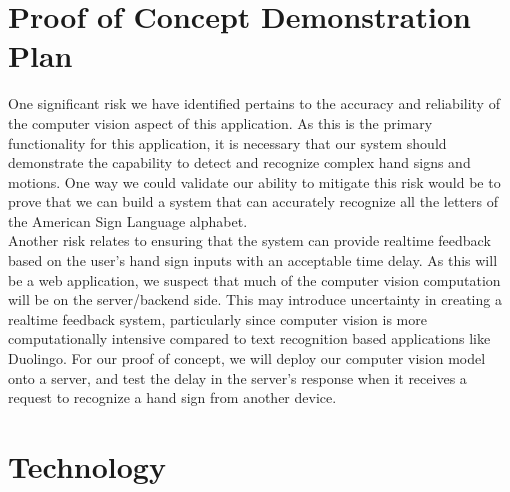 \documentclass{article}
\begin{document}
\section{Proof of Concept Demonstration Plan}

One significant risk we have identified pertains to the accuracy and reliability of the computer vision aspect of this application. As this is the
primary functionality for this application, it is necessary that our system should demonstrate the capability to detect and recognize complex
hand signs and motions. One way we could validate our ability to mitigate this risk would be to prove that we can build a 
system that can accurately recognize all the letters of the American Sign Language alphabet.
\\

Another risk relates to ensuring that the system can provide realtime feedback based on the user's hand sign inputs with
an acceptable time delay. As this will be a web application, we suspect that much of the computer vision computation will be on the 
server/backend side. This may introduce uncertainty in creating a realtime feedback system, particularly since computer vision is more computationally
intensive compared to text recognition based applications like Duolingo. For our proof of concept, we will deploy our computer vision model
onto a server, and test the delay in the server's response when it receives a request to recognize a hand sign from another device.

\section{Technology}
\end{document}
